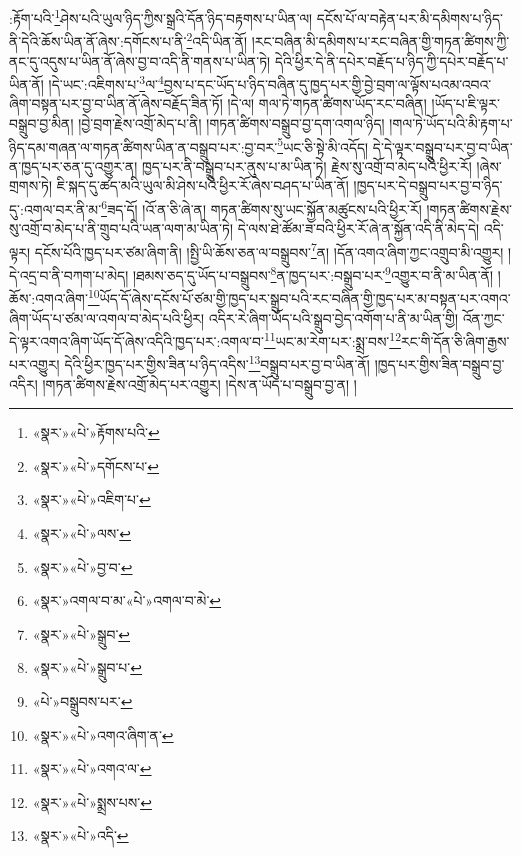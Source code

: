 :རྟོག་པའི་\footnote{«སྣར་»«པེ་»རྟོགས་པའི་}ཤེས་པའི་ཡུལ་ཉིད་ཀྱིས་སྒྲའི་དོན་ཉིད་བརྟགས་པ་ཡིན་ལ། དངོས་པོ་ལ་བརྟེན་པར་མི་དམིགས་པ་ཉིད་ནི་དེའི་ཆོས་ཡིན་ནོ་ཞེས་:དགོངས་པ་ནི་\footnote{«སྣར་»«པེ་»དགོངས་པ་}འདི་ཡིན་ནོ། །རང་བཞིན་མི་དམིགས་པ་རང་བཞིན་གྱི་གཏན་ཚིགས་ཀྱི་ནང་དུ་འདུས་པ་ཡིན་ནོ་ཞེས་བྱ་བ་འདི་ནི་གནས་པ་ཡིན་ཏེ། དེའི་ཕྱིར་དེ་ནི་དཔེར་བརྗོད་པ་ཉིད་ཀྱི་དཔེར་བརྗོད་པ་ཡིན་ནོ། །དེ་ཡང་:འཇིགས་པ་\footnote{«སྣར་»«པེ་»འཇིག་པ་}ལ་\footnote{«སྣར་»«པེ་»ལས་}བྱས་པ་དང་ཡོད་པ་ཉིད་བཞིན་དུ་ཁྱད་པར་གྱི་བྱེ་བྲག་ལ་ལྟོས་པའམ་འབའ་ཞིག་བསྟན་པར་བྱ་བ་ཡིན་ནོ་ཞེས་བརྗོད་ཟིན་ཏོ། །དེ་ལ། གལ་ཏེ་གཏན་ཚིགས་ཡོད་རང་བཞིན། །ཡོད་པ་ཇི་ལྟར་བསྒྲུབ་བྱ་མིན། །བྱེ་བྲག་རྗེས་འགྲོ་མེད་པ་ནི། །གཏན་ཚིགས་བསྒྲུབ་བྱ་དག་འགལ་ཉིད། །གལ་ཏེ་ཡོད་པའི་མི་རྟག་པ་ཉིད་དམ་གཞན་ལ་གཏན་ཚིགས་ཡིན་ན་བསྒྲུབ་པར་:བྱ་བར་\footnote{«སྣར་»«པེ་»བྱ་བ་}ཡང་ཅི་སྟེ་མི་འདོད། དེ་དེ་ལྟར་བསྒྲུབ་པར་བྱ་བ་ཡིན་ན་ཁྱད་པར་ཅན་དུ་འགྱུར་ན། ཁྱད་པར་ནི་བསྒྲུབ་པར་ནུས་པ་མ་ཡིན་ཏེ། རྗེས་སུ་འགྲོ་བ་མེད་པའི་ཕྱིར་རོ། །ཞེས་གྲགས་ཏེ། ཇི་སྐད་དུ་ཚད་མའི་ཡུལ་མི་ཤེས་པའི་ཕྱིར་རོ་ཞེས་བཤད་པ་ཡིན་ནོ། །ཁྱད་པར་དེ་བསྒྲུབ་པར་བྱ་བ་ཉིད་དུ་:འགལ་བར་ནི་མ་\footnote{«སྣར་»འགལ་བ་མ་«པེ་»འགལ་བ་མེ་}ཟད་དོ། །འོ་ན་ཅི་ཞེ་ན། གཏན་ཚིགས་སུ་ཡང་སྐྱོན་མཚུངས་པའི་ཕྱིར་རོ། །གཏན་ཚིགས་རྗེས་སུ་འགྲོ་བ་མེད་པ་ནི་གྲུབ་པའི་ཡན་ལག་མ་ཡིན་ཏེ། དེ་ལས་ཐེ་ཚོམ་ཟ་བའི་ཕྱིར་རོ་ཞེ་ན་སྐྱོན་འདི་ནི་མེད་དེ། འདི་ལྟར། དངོས་པོའི་ཁྱད་པར་ཙམ་ཞིག་ནི། །སྤྱི་ཡི་ཆོས་ཅན་ལ་བསྒྲུབས་\footnote{«སྣར་»«པེ་»སྒྲུབ་}ན། །དོན་འགའ་ཞིག་ཀྱང་འགྲུབ་མི་འགྱུར། །དེ་འདྲ་བ་ནི་བཀག་པ་མེད། །ཐམས་ཅད་དུ་ཡོད་པ་བསྒྲུབས་\footnote{«སྣར་»«པེ་»སྒྲུབ་པ་}ན་ཁྱད་པར་:བསྒྲུབ་པར་\footnote{«པེ་»བསྒྲུབས་པར་}འགྱུར་བ་ནི་མ་ཡིན་ནོ། །ཆོས་:འགའ་ཞིག་\footnote{«སྣར་»«པེ་»འགའ་ཞིག་ན་}ཡོད་དོ་ཞེས་དངོས་པོ་ཙམ་གྱི་ཁྱད་པར་སྒྲུབ་པའི་རང་བཞིན་གྱི་ཁྱད་པར་མ་བསྟན་པར་འགའ་ཞིག་ཡོད་པ་ཙམ་ལ་འགལ་བ་མེད་པའི་ཕྱིར། འདིར་རེ་ཞིག་ཡོད་པའི་སྒྲུབ་བྱེད་འགོག་པ་ནི་མ་ཡིན་གྱི། འོན་ཀྱང་དེ་ལྟར་འགའ་ཞིག་ཡོད་དོ་ཞེས་འདིའི་ཁྱད་པར་:འགལ་བ་\footnote{«སྣར་»«པེ་»འགའ་ལ་}ཡང་མ་རེག་པར་:སྨྲ་བས་\footnote{«སྣར་»«པེ་»སྨྲས་པས་}རང་གི་དོན་ཅི་ཞིག་རྒྱས་པར་འགྱུར། དེའི་ཕྱིར་ཁྱད་པར་གྱིས་ཟིན་པ་ཉིད་འདིས་\footnote{«སྣར་»«པེ་»འདི་}བསྒྲུབ་པར་བྱ་བ་ཡིན་ནོ། །ཁྱད་པར་གྱིས་ཟིན་བསྒྲུབ་བྱ་འདིར། །གཏན་ཚིགས་རྗེས་འགྲོ་མེད་པར་འགྱུར། །དེས་ན་ཡོད་པ་བསྒྲུབ་བྱ་ན། །

